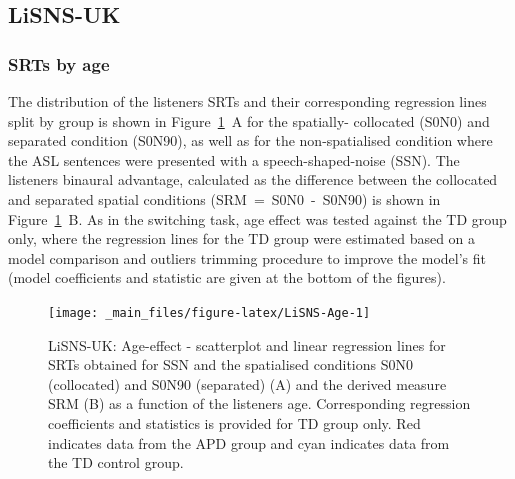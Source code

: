 \documentclass[a4paper, twoside]{templates/ociamthesis}
\begin{document}
\hypertarget{lisns-uk}{%
\subsection{LiSNS-UK}\label{lisns-uk}}

\hypertarget{srts-by-age}{%
\subsubsection*{SRTs by age}\label{srts-by-age}}

The distribution of the listeners SRTs and their corresponding regression lines split by group is shown in Figure~\ref{fig:LiSNS-Age}~A for the spatially- collocated (S0N0) and separated condition (S0N90), as well as for the non-spatialised condition where the ASL sentences were presented with a speech-shaped-noise (SSN). The listeners binaural advantage, calculated as the difference between the collocated and separated spatial conditions (SRM~=~S0N0~-~S0N90) is shown in Figure~\ref{fig:LiSNS-Age}~B. As in the switching task, age effect was tested against the TD group only, where the regression lines for the TD group were estimated based on a model comparison and outliers trimming procedure to improve the model's fit (model coefficients and statistic are given at the bottom of the figures).\\

\begin{figure}

{\centering \texttt{[image: \_main\_files/figure-latex/LiSNS-Age-1]} 

}

\caption{LiSNS-UK: Age-effect - scatterplot and linear regression lines for SRTs obtained for SSN and the spatialised conditions S0N0 (collocated) and S0N90 (separated) (A) and the derived measure SRM (B) as a function of the listeners age. Corresponding regression coefficients and statistics is provided for TD group only. Red indicates data from the APD group and cyan indicates data from the TD control group.}\label{fig:LiSNS-Age}
\end{figure}
\end{document}
